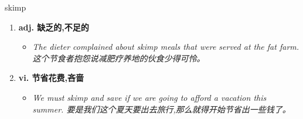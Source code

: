 
\begin{frame}
{\huge skimp}
\begin{center}
\begin{enumerate}\Large
  \item \textbf{adj. 缺乏的,不足的}
  \begin{itemize}
    \item \em{\Large{The dieter complained about skimp meals that were served at the fat farm. 这个节食者抱怨说减肥疗养地的伙食少得可怜。}}
  \end{itemize}
  \item \textbf{vi. 节省花费,吝啬}
  \begin{itemize}
    \item \em{\Large{We must skimp and save if we are going to afford a vacation this summer. 要是我们这个夏天要出去旅行,那么就得开始节省出一些钱了。}}
  \end{itemize}
\end{enumerate}
\end{center}
\end{frame}

